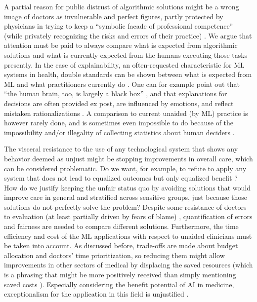     A partial reason for public distrust of algorithmic solutions might be a wrong image of doctors as invulnerable and perfect figures, partly protected by physicians in trying to keep a ``symbolic facade of professional competence'' (while privately recognizing the risks and errors of their practice) \cite{Waring2005}.
    We argue that attention must be paid to always compare what is expected from algorithmic solutions and what is currently expected from the humans executing those tasks presently.
    In the case of explainability, an often-requested characteristic for ML systems in health, double standards can be shown between what is expected from ML and what practitioners currently do \cite{Zerilli2019}.
    One can for example point out that ``the human brain, too, is largely a black box'' \cite[p.~666]{Zerilli2019}, and that explanations for decisions are often provided ex post, are influenced by emotions, and reflect mistaken rationalizations \cite{Zerilli2019}.
    A comparison to current unaided (by ML) practice is however rarely done, and is sometimes even impossible to do because of the impossibility and/or illegality of collecting statistics about human deciders \cite{Williamson2021}.

    The visceral resistance to the use of any technological system that shows any behavior deemed as unjust might be stopping improvements in overall care, which can be considered problematic.
    Do we want, for example, to refute to apply any system that does not lead to equalized outcomes but only equalized benefit \cite{Rajkomar2018}?
    How do we justify keeping the unfair status quo by avoiding solutions that would improve care in general and stratified across sensitive groups, just because those solutions do not perfectly solve the problem?
    Despite some resistance of doctors to evaluation (at least partially driven by fears of blame) \cite{Waring2005}, quantification of errors and fairness are needed to compare different solutions.
    Furthermore, the time efficiency and cost of the ML applications with respect to unaided clinicians must be taken into account.
    As discussed before, trade-offs are made about budget allocation and doctors' time prioritization, so reducing them might allow improvements in other sectors of medical by displacing the saved resources (which is a phrasing that might be more positively received than simply mentioning saved costs \cite{Tetlock2003}).
    Especially considering the benefit potential of AI in medicine, exceptionalism for the application in this field is unjustified \cite{Fletcher2021}.

